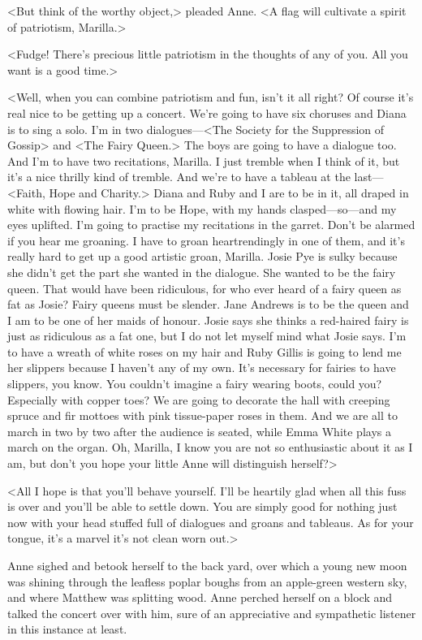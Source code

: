 <But think of the worthy object,> pleaded Anne. <A flag will cultivate a spirit of patriotism, Marilla.>

<Fudge! There's precious little patriotism in the thoughts of any of you. All you want is a good time.>

<Well, when you can combine patriotism and fun, isn't it all right? Of course it's real nice to be getting up a concert. We're going to have six choruses and Diana is to sing a solo. I'm in two dialogues—<The Society for the Suppression of Gossip> and <The Fairy Queen.> The boys are going to have a dialogue too. And I'm to have two recitations, Marilla. I just tremble when I think of it, but it's a nice thrilly kind of tremble. And we're to have a tableau at the last—<Faith, Hope and Charity.> Diana and Ruby and I are to be in it, all draped in white with flowing hair. I'm to be Hope, with my hands clasped—so—and my eyes uplifted. I'm going to practise my recitations in the garret. Don't be alarmed if you hear me groaning. I have to groan heartrendingly in one of them, and it's really hard to get up a good artistic groan, Marilla. Josie Pye is sulky because she didn't get the part she wanted in the dialogue. She wanted to be the fairy queen. That would have been ridiculous, for who ever heard of a fairy queen as fat as Josie? Fairy queens must be slender. Jane Andrews is to be the queen and I am to be one of her maids of honour. Josie says she thinks a red-haired fairy is just as ridiculous as a fat one, but I do not let myself mind what Josie says. I'm to have a wreath of white roses on my hair and Ruby Gillis is going to lend me her slippers because I haven't any of my own. It's necessary for fairies to have slippers, you know. You couldn't imagine a fairy wearing boots, could you? Especially with copper toes? We are going to decorate the hall with creeping spruce and fir mottoes with pink tissue-paper roses in them. And we are all to march in two by two after the audience is seated, while Emma White plays a march on the organ. Oh, Marilla, I know you are not so enthusiastic about it as I am, but don't you hope your little Anne will distinguish herself?>

<All I hope is that you'll behave yourself. I'll be heartily glad when all this fuss is over and you'll be able to settle down. You are simply good for nothing just now with your head stuffed full of dialogues and groans and tableaus. As for your tongue, it's a marvel it's not clean worn out.>

Anne sighed and betook herself to the back yard, over which a young new moon was shining through the leafless poplar boughs from an apple-green western sky, and where Matthew was splitting wood. Anne perched herself on a block and talked the concert over with him, sure of an appreciative and sympathetic listener in this instance at least.

